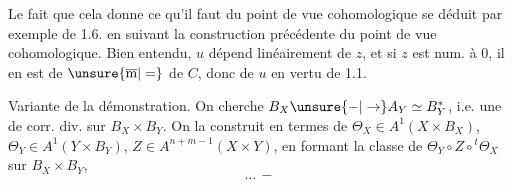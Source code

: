 Le fait que cela donne ce qu'il faut du point de vue cohomologique se déduit par exemple de 1.6. en suivant la construction précédente du point de vue cohomologique. Bien entendu, $u$ dépend linéairement de $z$, et si $z$ est num.  à $0$, il en est de $\unsure{\overline{\mathrm m}|=}$ de $C$, donc de $u$ en vertu de 1.1.

Variante de la démonstration. On cherche $B_X\unsure{\mathord{-}|\to} A_Y\simeq B_Y^*$, i.e. une  de corr. div. sur $B_X\times B_Y$. On la construit en termes de $\Theta_X\in A^1(X\times B_X)$, $\Theta_Y\in A^1(Y\times B_Y)$, $Z\in A^{n+m-1}(X\times Y)$,  en formant la classe de  $\Theta_Y\circ Z\circ{}^t\Theta_X$ sur $B_X\times B_Y$,
\[
\ldots\,-
\]


